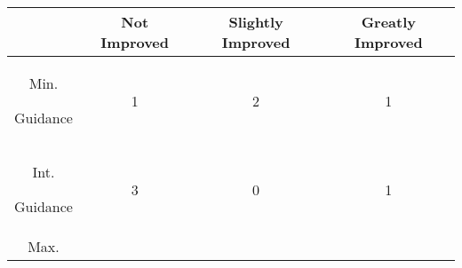         \begin{table}







        \begin{center}







            \begin{tabular}{|c|c|c|c|}







                \hline







                    & Not Improved & Slightly Improved & Greatly Improved \\







                \hline







                Min. %







Guidance & 1 & 2 & 1\\







                \hline







                Int. %







Guidance & 3 & 0 & 1\\







                \hline







                Max. %








\end{tabular}
\end{center}
\end{table}
